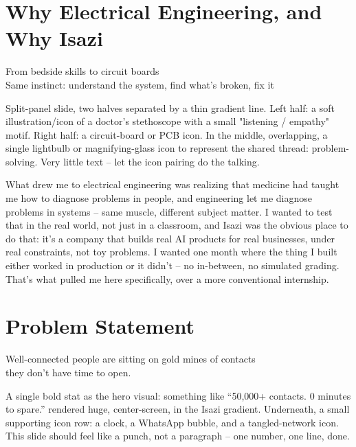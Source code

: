 \documentclass[11pt]{article}
\begin{document}
\section{Why Electrical Engineering, and Why Isazi}

\begin{onslide}
From bedside skills to circuit boards\\
Same instinct: understand the system, find what's broken, fix it
\end{onslide}

\begin{visual}
Split-panel slide, two halves separated by a thin gradient line. Left half: a soft
illustration/icon of a doctor's stethoscope with a small "listening / empathy" motif.
Right half: a circuit-board or PCB icon. In the middle, overlapping, a single lightbulb
or magnifying-glass icon to represent the shared thread: problem-solving. Very little
text -- let the icon pairing do the talking.
\end{visual}

\begin{scriptbox}
What drew me to electrical engineering was realizing that medicine had taught me how to
diagnose problems in people, and engineering let me diagnose problems in systems --
same muscle, different subject matter. I wanted to test that in the real world, not just
in a classroom, and Isazi was the obvious place to do that: it's a company that builds
real AI products for real businesses, under real constraints, not toy problems. I wanted
one month where the thing I built either worked in production or it didn't -- no
in-between, no simulated grading. That's what pulled me here specifically, over a
more conventional internship.
\end{scriptbox}

\section{Problem Statement}

\begin{onslide}
Well-connected people are sitting on gold mines of contacts\\
they don't have time to open.
\end{onslide}

\begin{visual}
A single bold stat as the hero visual: something like ``50{,}000+ contacts. 0 minutes to
spare.'' rendered huge, center-screen, in the Isazi gradient. Underneath, a small
supporting icon row: a clock, a WhatsApp bubble, and a tangled-network icon. This slide
should feel like a punch, not a paragraph -- one number, one line, done.
\end{visual}
\end{document}
